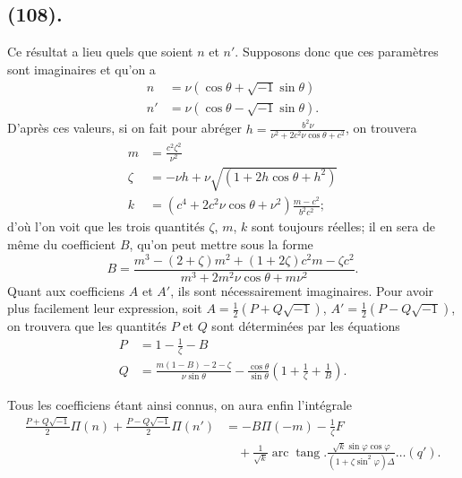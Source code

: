 \documentclass{article}
\begin{document}
\subsection*{(108).}

Ce résultat a lieu quels que soient $n$ et $n'$. Supposons donc que ces paramètres sont imaginaires et qu'on a
\[ \begin{aligned} n&=\nu(\cos\theta+\sqrt{-1}\sin\theta)\\ n'&=\nu(\cos\theta-\sqrt{-1}\sin\theta). \end{aligned} \]
D'après ces valeurs, si on fait pour abréger $h=\frac{b^{2}\nu}{\nu^{2}+2c^{2}\nu\cos\theta+c^{2}}$, on trouvera
\[ \begin{aligned} m&=\frac{c^{2}\zeta^{2}}{\nu^{2}}\\ \zeta&=-\nu h+\nu\sqrt{(1+2h\cos\theta+h^{2})}\\ k&=(c^{4}+2c^{2}\nu\cos\theta+\nu^{2})\frac{m-c^{2}}{b^{2}c^{2}}; \end{aligned} \]
d'où l'on voit que les trois quantités $\zeta$, $m$, $k$ sont toujours réelles; il en sera de même du coefficient $B$, qu'on peut mettre sous la forme
\[ B=\frac{m^{3}-(2+\zeta)m^{2}+(1+2\zeta)c^{2}m-\zeta c^{2}}{m^{3}+2m^{2}\nu\cos\theta+m\nu^{2}}. \]
Quant aux coefficiens $A$ et $A'$, ils sont nécessairement imaginaires. Pour avoir plus facilement leur expression, soit $A=\frac{1}{2}(P+Q\sqrt{-1})$, $A'=\frac{1}{2}(P-Q\sqrt{-1})$, on trouvera que les quantités $P$ et $Q$ sont déterminées par les équations
\[ \begin{aligned} P&=1-\frac{1}{\zeta}-B\\ Q&=\frac{m(1-B)-2-\zeta}{\nu\sin\theta}-\frac{\cos\theta}{\sin\theta}\left(1+\frac{1}{\zeta}+\frac{1}{B}\right). \end{aligned} \]

Tous les coefficiens étant ainsi connus, on aura enfin l'intégrale
\[ \begin{aligned} \frac{P+Q\sqrt{-1}}{2}\Pi(n)+\frac{P-Q\sqrt{-1}}{2}\Pi(n')&=-B\Pi(-m)-\frac{1}{\zeta}F\\ &\quad+\frac{1}{\sqrt{k}}\operatorname{arc}\operatorname{tang}.\frac{\sqrt{k}\sin\varphi\cos\varphi}{(1+\zeta\sin^{2}\varphi)\Delta}\ldots(q'). \end{aligned} \]
\end{document}
